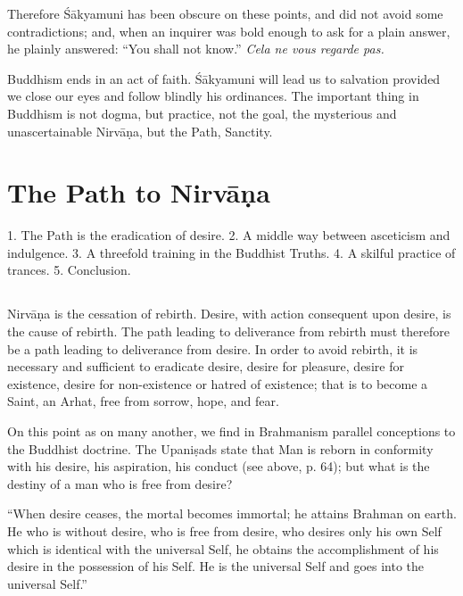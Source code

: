 \documentclass[a4paper, 11pt, oneside, english]{article}
\begin{document}
Therefore Śākyamuni has been obscure on these points, and did not avoid some contradictions; and, when an inquirer was bold enough to ask for a plain answer, he plainly answered: ``You shall not know.'' \emph{Cela ne vous regarde pas.}

Buddhism ends in an act of faith. Śākyamuni will lead us to salvation provided we close our eyes and follow blindly his ordinances. The important thing in Buddhism is not dogma, but practice, not the goal, the mysterious and unascertainable Nirvāṇa, but the Path, Sanctity.
\clearpage
\section{The Path to Nirvāṇa}
\begin{center}\footnotesize
1. The Path is the eradication of desire. 2. A middle way between asceticism and indulgence. 3. A threefold training in the Buddhist Truths. 4. A skilful practice of trances. 5. Conclusion.
\end{center}
\subsection{}
\paragraph{}
Nirvāṇa is the cessation of rebirth. Desire, with action consequent upon desire, is the cause of rebirth. The path leading to deliverance from rebirth must therefore be a path leading to deliverance from desire. In order to avoid rebirth, it is necessary and sufficient to eradicate desire, desire for pleasure, desire for existence, desire for non-existence or hatred of existence; that is to become a Saint, an Arhat, free from sorrow, hope, and fear.

On this point as on many another, we find in Brahmanism parallel conceptions to the Buddhist doctrine. The Upaniṣads state that Man is reborn in conformity with his desire, his aspiration, his conduct (see above, p. 64); but what is the destiny of a man who is free from desire?

``When desire ceases, the mortal becomes immortal; he attains Brahman on earth. He who is without desire, who is free from desire, who desires only his own Self which is identical with the universal Self, he obtains the accomplishment of his desire in the possession of his Self. He is the universal Self and goes into the universal Self.''
\end{document}
